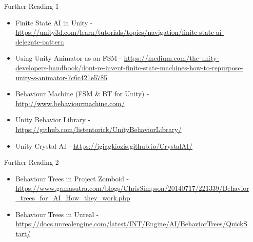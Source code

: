 \begin{frame}{Further Reading 1}
	\begin{itemize}
		\item Finite State AI in Unity - \url{https://unity3d.com/learn/tutorials/topics/navigation/finite-state-ai-delegate-pattern}
		\item Using Unity Animator as an FSM - \url{https://medium.com/the-unity-developers-handbook/dont-re-invent-finite-state-machines-how-to-repurpose-unity-s-animator-7c6c421e5785}
		\item Behaviour Machine (FSM \& BT for Unity) - \url{http://www.behaviourmachine.com/}
		\item Unity Behavior Library - \url{https://github.com/listentorick/UnityBehaviorLibrary/}
		\item Unity Crystal AI - \url{https://igiagkiozis.github.io/CrystalAI/}
	\end{itemize}
\end{frame}

\begin{frame}{Further Reading 2}
\begin{itemize}
	\item Behaviour Trees in Project Zomboid - \url{https://www.gamasutra.com/blogs/ChrisSimpson/20140717/221339/Behavior_trees_for_AI_How_they_work.php}
	\item Behaviour Trees in Unreal - \url{https://docs.unrealengine.com/latest/INT/Engine/AI/BehaviorTrees/QuickStart/}
\end{itemize}
\end{frame}
